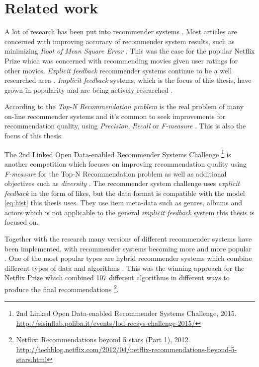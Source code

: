 \chapter{Related work}\label{cha:relwork}

A lot of research has been put into recommender systems \citep{bobadilla2013recommender}. Most articles are concerned with improving accuracy of recommender system results, such as minimizing \textit{Root of Mean Square Error} \prmse. This was the case for the popular Netflix Prize \citep{bennett2007netflix} which was concerned with recommending movies given user ratings for other movies. \textit{Explicit feedback} recommender systems continue to be a well researched area \citep{bobadilla2013recommender}. \textit{Implicit feedback} systems, which is the focus of this thesis, have grown in popularity and are being actively researched \citep{hu2008collaborative, bobadilla2013recommender}.

According to \citep{lai2012hybrid} the \textit{Top-N Recommendation problem} is the real problem of many on-line recommender systems and it's common to seek improvements for recommendation quality, using \textit{Precision}, \textit{Recall} or \textit{F-measure} \citep{bobadilla2013recommender}. This is also the focus of this thesis.

The 2nd Linked Open Data-enabled Recommender Systems Challenge
\footnote{2nd Linked Open Data-enabled Recommender Systems Challenge, 2015. \url{http://sisinflab.poliba.it/events/lod-recsys-challenge-2015/}}
is another competition which focuses on improving recommendation quality using \textit{F-measure} for the Top-N Recommendation problem as well as additional objectives such as \textit{diversity} \citep{bobadilla2013recommender}. The recommender system challenge uses \textit{explicit feedback} in the form of likes, but the data format is compatible with the model \eqref{eq:hist} this thesis uses. They use item meta-data such as genres, albums and actors which is not applicable to the general \textit{implicit feedback} system this thesis is focused on.

Together with the research many versions of different recommender systems have been implemented, with recommender systems becoming more and more popular \citep{bobadilla2013recommender}. One of the most popular types are hybrid recommender systems which combine different types of data and algorithms \citep{bobadilla2013recommender, lai2012hybrid}. This was the winning approach for the Netflix Prize which combined 107 different algorithms in different ways to produce the final recommendations
\footnote{ Netflix: Recommendations beyond 5 stars (Part 1), 2012. \url{http://techblog.netflix.com/2012/04/netflix-recommendations-beyond-5-stars.html} }.

